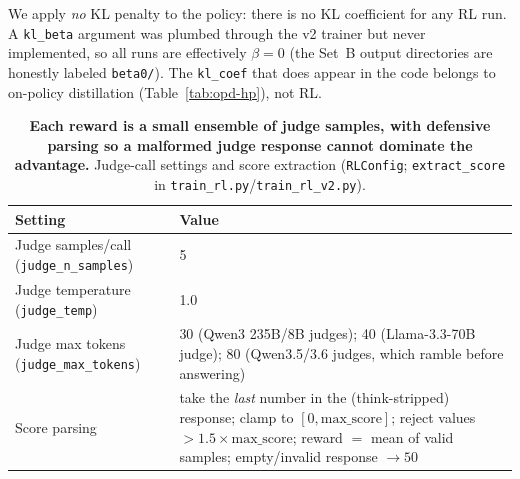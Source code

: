 We apply \emph{no} KL penalty to the policy: there is no KL coefficient for any RL
run. A \texttt{kl\_beta} argument was plumbed through the v2 trainer but never
implemented, so all runs are effectively $\beta=0$ (the Set~B output directories are
honestly labeled \texttt{beta0/}). The \texttt{kl\_coef} that does appear in the code
belongs to on-policy distillation (Table~\ref{tab:opd-hp}), not RL.

\begin{table}[h]
\centering
\caption{\textbf{Each reward is a small ensemble of judge samples, with defensive
parsing so a malformed judge response cannot dominate the advantage.} Judge-call
settings and score extraction (\texttt{RLConfig}; \texttt{extract\_score} in
\texttt{train\_rl.py}/\texttt{train\_rl\_v2.py}).}
\begin{tabularx}{\linewidth}{@{}lX@{}}
\toprule
Setting & Value \\
\midrule
Judge samples/call (\texttt{judge\_n\_samples}) & 5 \\
\addlinespace
Judge temperature (\texttt{judge\_temp}) & 1.0 \\
\addlinespace
Judge max tokens (\texttt{judge\_max\_tokens}) & 30 (Qwen3 235B/8B judges);
  40 (Llama-3.3-70B judge); 80 (Qwen3.5/3.6 judges, which ramble before answering) \\
\addlinespace
Score parsing & take the \emph{last} number in the (think-stripped) response;
  clamp to $[0,\text{max\_score}]$; reject values $>1.5\times\text{max\_score}$;
  reward $=$ mean of valid samples; empty/invalid response $\to 50$ \\
\bottomrule
\end{tabularx}
\end{table}

